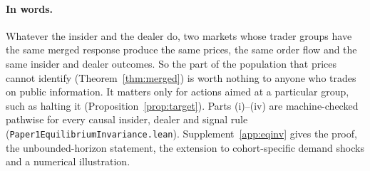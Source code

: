 \paragraph{In words.} Whatever the insider and the dealer do, two markets whose trader groups have the same merged response produce the same prices, the same order flow and the same insider and dealer outcomes. So the part of the population that prices cannot identify (Theorem~\ref{thm:merged}) is worth nothing to anyone who trades on public information. It matters only for actions aimed at a particular group, such as halting it (Proposition~\ref{prop:target}). Parts (i)--(iv) are machine-checked pathwise for every causal insider, dealer and signal rule (\nolinkurl{Paper1EquilibriumInvariance.lean}). Supplement~\ref{app:eqinv} gives the proof, the unbounded-horizon statement, the extension to cohort-specific demand shocks and a numerical illustration.

